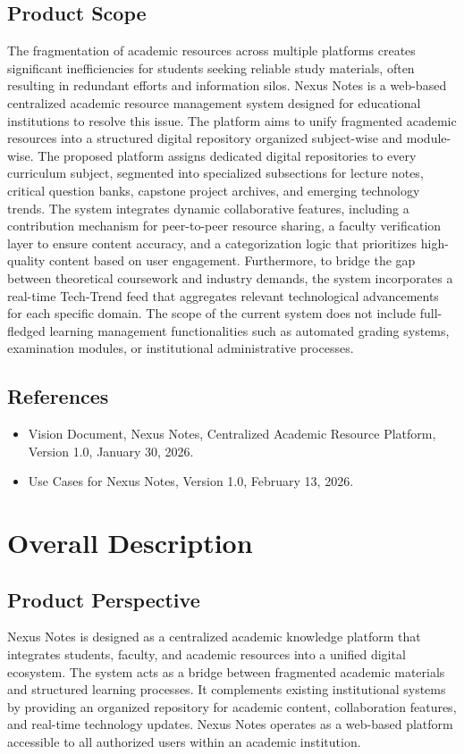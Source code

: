 \documentclass[12pt]{article}
\begin{document}
\subsection{Product Scope}
The fragmentation of academic resources across multiple platforms creates significant inefficiencies for students seeking reliable study materials, often resulting in redundant efforts and information silos.
Nexus Notes is a web-based centralized academic resource management system designed for educational institutions to resolve this issue.
The platform aims to unify fragmented academic resources into a structured digital repository organized subject-wise and module-wise.
The proposed platform assigns dedicated digital repositories to every curriculum subject, segmented into specialized subsections for lecture notes, critical question banks, capstone project archives, and emerging technology trends.
The system integrates dynamic collaborative features, including a contribution mechanism for peer-to-peer resource sharing, a faculty verification layer to ensure content accuracy, and a categorization logic that prioritizes high-quality content based on user engagement.
Furthermore, to bridge the gap between theoretical coursework and industry demands, the system incorporates a real-time Tech-Trend feed that aggregates relevant technological advancements for each specific domain.
The scope of the current system does not include full-fledged learning management functionalities such as automated grading systems, examination modules, or institutional administrative processes.

\subsection{References}
\begin{itemize}
    \item Vision Document, Nexus Notes, Centralized Academic Resource Platform, Version 1.0, January 30, 2026.
    \item Use Cases for Nexus Notes, Version 1.0, February 13, 2026.
\end{itemize}

\section{Overall Description}

\subsection{Product Perspective}
Nexus Notes is designed as a centralized academic knowledge platform that integrates students, faculty, and academic resources into a unified digital ecosystem.
The system acts as a bridge between fragmented academic materials and structured learning processes.
It complements existing institutional systems by providing an organized repository for academic content, collaboration features, and real-time technology updates.
Nexus Notes operates as a web-based platform accessible to all authorized users within an academic institution.
\end{document}
